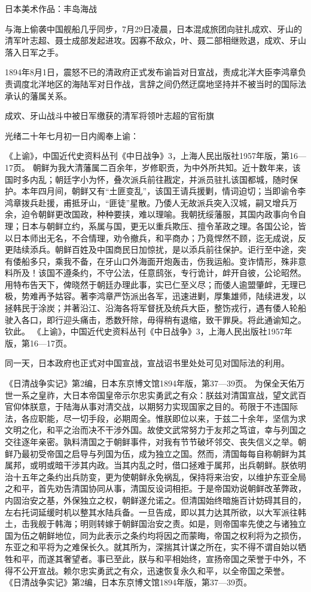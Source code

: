 \documentclass[12pt,UTF8]{ctexbook}
\begin{document}
日本美术作品：丰岛海战

与海上偷袭中国舰船几乎同步，7月29日凌晨，日本混成旅团向驻扎成欢、牙山的清军叶志超、聂士成部发起进攻。因寡不敌众，叶、聂二部相继败退，成欢、牙山落入日军之手。

1894年8月1日，震怒不已的清政府正式发布谕旨对日宣战，责成北洋大臣李鸿章负责调度北洋地区的海陆军对日作战，言辞之间仍然迂腐地坚持并不被当时的国际法承认的藩属关系。


成欢、牙山战斗中被日军缴获的清军将领叶志超的官衔旗

光绪二十年七月初一日内阁奉上谕：

《上谕》，中国近代史资料丛刊《中日战争》3，上海人民出版社1957年版，第16—17页。
朝鲜为我大清藩属二百余年，岁修职贡，为中外所共知。近十数年来，该国时多内乱；朝廷字小为怀，叠次派兵前往戡定，并派员驻扎该国都城，随时保护。本年四月间，朝鲜又有“土匪变乱”，该国王请兵援剿，情词迫切；当即谕令李鸿章拨兵赴援，甫抵牙山，“匪徒”星散。乃倭人无故派兵突入汉城，嗣又增兵万余，迫令朝鲜更改国政，种种要挟，难以理喻。我朝抚绥藩服，其国内政事向令自理；日本与朝鲜立约，系属与国，更无以重兵欺压、擅令革政之理。各国公论，皆以日本师出无名，不合情理，劝令撤兵，和平商办；乃竟悍然不顾，迄无成说，反更陆续添兵。朝鲜百姓及中国商民日加惊扰，是以添兵前往保护。讵行至中途，突有倭船多只，乘我不备，在牙山口外海面开炮轰击，伤我运船。变诈情形，殊非意料所及！该国不遵条约，不守公法，任意鸱张，专行诡计，衅开自彼，公论昭然。用特布告天下，俾晓然于朝廷办理此事，实已仁至义尽；而倭人逾盟肇衅，无理已极，势难再予姑容。著李鸿章严饬派出各军，迅速进剿，厚集雄师，陆续进发，以拯韩民于涂炭；并著沿江、沿海各将军督抚及统兵大臣，整饬戎行，遇有倭人轮船驶入各口，即行迎头痛击，悉数歼除，毋得稍有退缩，致干罪戾。将此通谕知之。钦此。 《上谕》，中国近代史资料丛刊《中日战争》3，上海人民出版社1957年版，第16—17页。

同一天，日本政府也正式对中国宣战，宣战诏书里处处可见对国际法的利用。

《日清战争实记》第2编，日本东京博文馆1894年版，第37—39页。
为保全天佑万世一系之皇祚，大日本帝国皇帝示尔忠实勇武之有众：朕兹对清国宣战，望文武百官仰体朕意，于陆海从事对清交战，以期努力实现国家之目的。苟限于不违国际法，各应职能，尽一切手段，必期周全。惟朕即位以来，于兹二十余年，坚信为求文明之化，和平之治而决不干涉外国。故使文武常努力于友邦之笃谊，幸与列国之交往逐年亲密。孰料清国之于朝鲜事件，对我有节节破坏邻交、丧失信义之举。朝鲜乃最初受帝国之启导与列国为伍，成为独立之国。然而，清国每每自称朝鲜为其属邦，或明或暗干涉其内政。当其内乱之时，借口拯难于属邦，出兵朝鲜。朕依明治十五年之条约出兵防变，更为使朝鲜永免祸乱，保持将来治安，以维护东亚全局之和平，首先劝告清国协同从事，清国反设词相拒。于是帝国劝说朝鲜改革弊政，内固治安之基，外保独立之权，朝鲜遂允诺之。但清国始终暗施百计妨碍其目的，左右托词延缓时机以整其水陆兵备。一旦告成，即以其力达其所欲，以大军派往韩土，击我舰于韩海；明则转嫁于朝鲜国治安之责。如是，则帝国率先使之与诸独立国为伍之朝鲜地位，同为此表示之条约均将因之而蒙晦，帝国之权利将为之损伤，东亚之和平将为之难保长久。就其所为，深揣其计谋之所在，实不得不谓自始以牺牲和平，而遂其奢望者。事已至此，朕与和平相始终，宣扬帝国之荣誉于中外，不得不公开宣战。赖尔忠实勇武之有众，迅速恢复永久和平，以全帝国之荣誉。 《日清战争实记》第2编，日本东京博文馆1894年版，第37—39页。
\end{document}
